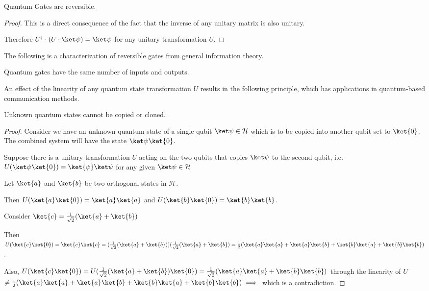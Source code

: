 \begin{prop}
    Quantum Gates are reversible.
\end{prop}
\begin{proof}
    This is a direct consequence of the fact that the inverse of any unitary matrix is also unitary.

    Therefore $U^\dagger \cdot (U \cdot \ket\psi) = \ket\psi$ for any unitary transformation $U$.
\end{proof}

The following is a characterization of reversible gates from general information theory.
\begin{lemma}
    Quantum gates have the same number of inputs and outputs.
\end{lemma}

An effect of the linearity of any quantum state transformation $U$ results in the following principle, which has applications in quantum-based communication methods.

\begin{prop}
    Unknown quantum states cannot be copied or cloned.
\end{prop}
\begin{proof}
    Consider we have an unknown quantum state of a single qubit $\ket\psi \in \mathcal{H}$ which is to be copied into another qubit set to $\ket{0}$.  The combined system will have the state $\ket\psi \ket{0}$.

    Suppose there is a unitary transformation $U$ acting on the two qubits that copies $\ket\psi$ to the second qubit, i.e.
    $U(\ket\psi \ket{0}) = \ket{\psi} \ket\psi$ for any given $\ket\psi \in \mathcal{H}$
    
    Let $\ket{a}$ and $\ket{b}$ be two orthogonal states in $\mathcal{H}$.

    Then $U(\ket{a}\ket{0}) = \ket{a}\ket{a}$ and $U(\ket{b}\ket{0}) = \ket{b} \ket{b}$.

    Consider $\ket{c} = \frac{1}{\sqrt{2}} (\ket{a} + \ket{b})$

    Then $U(\ket{c}\ket{0}) = \ket{c} \ket{c} = (\frac{1}{\sqrt{2}} (\ket{a} + \ket{b}) ) (\frac{1}{\sqrt{2}} (\ket{a} + \ket{b}) = \frac{1}{2} (\ket{a}\ket{a} + \ket{a}\ket{b} + \ket{b}\ket{a} + \ket{b}\ket{b})$.

    Also, $U (\ket{c} \ket{0}) = U(\frac{1}{\sqrt{2}} (\ket{a} + \ket{b}) \ket{0}) = \frac{1}{\sqrt{2}} (\ket{a}\ket{a} + \ket{b}\ket{b})$ through the linearity of $U$ $\neq \frac{1}{2} (\ket{a}\ket{a} + \ket{a}\ket{b} + \ket{b}\ket{a} + \ket{b}\ket{b}) \implies $ which is a contradiction.

\end{proof}
